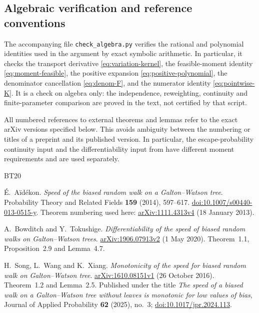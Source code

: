 \documentclass[11pt,a4paper]{article}
\numberwithin{equation}{section}
\theoremstyle{notethm}
\theoremstyle{definition}
\begin{document}
\subsection{Algebraic verification and reference conventions}

The accompanying file \texttt{check\_algebra.py} verifies the rational and
polynomial identities used in the argument by exact symbolic arithmetic.
In particular, it checks the transport derivative
\eqref{eq:variation-kernel}, the feasible-moment identity
\eqref{eq:moment-feasible}, the positive expansion
\eqref{eq:positive-polynomial}, the denominator cancellation
\eqref{eq:denom-F}, and the numerator identity \eqref{eq:pointwise-K}.
It is a check on algebra only: the independence, reweighting, continuity and
finite-parameter comparison are proved in the text, not certified by that
script.

All numbered references to external theorems and lemmas refer to the exact
arXiv versions specified below. This avoids ambiguity between the numbering
or titles of a preprint and its published version. In particular, the
escape-probability continuity input and the differentiability input from
\cite{BT} have different moment requirements and are used separately.

\begingroup
\small
\begin{thebibliography}{BT20}
\setlength{\itemsep}{0.5em}

\'{E}.~A\"id\'ekon.
\emph{Speed of the biased random walk on a Galton--Watson tree}.
Probability Theory and Related Fields \textbf{159} (2014), 597--617.
\href{https://doi.org/10.1007/s00440-013-0515-y}{doi:10.1007/s00440-013-0515-y}.
Theorem numbering used here:
\href{https://arxiv.org/abs/1111.4313v4}{arXiv:1111.4313v4} (18 January 2013).

A.~Bowditch and Y.~Tokushige.
\emph{Differentiability of the speed of biased random walks on
Galton--Watson trees}.
\href{https://arxiv.org/abs/1906.07913v2}{arXiv:1906.07913v2}
(1 May 2020).
Theorem~1.1, Proposition~2.9 and Lemma~4.7.

H.~Song, L.~Wang and K.~Xiang.
\emph{Monotonicity of the speed for biased random walk on
Galton--Watson tree}.
\href{https://arxiv.org/abs/1610.08151v1}{arXiv:1610.08151v1}
(26 October 2016).
Theorem~1.2 and Lemma~2.5.
Published under the title \emph{The speed of a biased walk on a
Galton--Watson tree without leaves is monotonic for low values of bias},
Journal of Applied Probability \textbf{62} (2025), no.~3;
\href{https://doi.org/10.1017/jpr.2024.113}{doi:10.1017/jpr.2024.113}.

\end{thebibliography}
\endgroup
\end{document}
